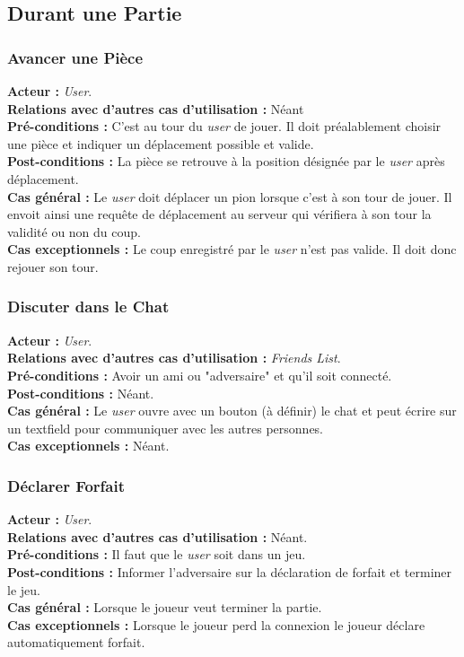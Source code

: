 \documentclass[10pt, a4paper]{article}
\begin{document}
\subsection{Durant une Partie}

\subsubsection{Avancer une Pièce}
\textbf{Acteur :} \textit{User}.\\
\textbf{Relations avec d'autres cas d'utilisation :} Néant \\
\textbf{Pré-conditions :} C'est au tour du \textit{user} de jouer. Il doit préalablement choisir une pièce et indiquer un déplacement possible et valide. \\
\textbf{Post-conditions :} La pièce se retrouve à la position désignée par le \textit{user} après déplacement. \\
\textbf{Cas général :} Le \textit{user} doit déplacer un pion lorsque c'est à son tour de jouer. Il envoit ainsi une requête de déplacement au serveur qui vérifiera à son tour la validité ou non du coup. \\
\textbf{Cas exceptionnels :} Le coup enregistré par le \textit{user} n'est pas valide. Il doit donc rejouer son tour. \\

\subsubsection{Discuter dans le Chat}
\textbf{Acteur :} \textit{User}.\\
\textbf{Relations avec d'autres cas d'utilisation :} \textit{Friends List}.\\
\textbf{Pré-conditions :} Avoir un ami ou "adversaire" et qu'il soit connecté.\\
\textbf{Post-conditions :} Néant.\\
\textbf{Cas général :} Le \textit{user} ouvre avec un bouton (à définir) le chat et peut écrire sur un textfield pour communiquer avec les autres personnes.\\ %
\textbf{Cas exceptionnels :} Néant.

\subsubsection{Déclarer Forfait}
\textbf{Acteur :} \textit{User}.\\
\textbf{Relations avec d'autres cas d'utilisation :} Néant.\\
\textbf{Pré-conditions :} Il faut que le \textit{user} soit dans un jeu. \\
\textbf{Post-conditions :} Informer l'adversaire sur la déclaration de forfait et terminer le jeu.\\
\textbf{Cas général :} Lorsque le joueur veut terminer la partie.\\
\textbf{Cas exceptionnels :} Lorsque le joueur perd la connexion le joueur déclare automatiquement forfait. %
\end{document}
